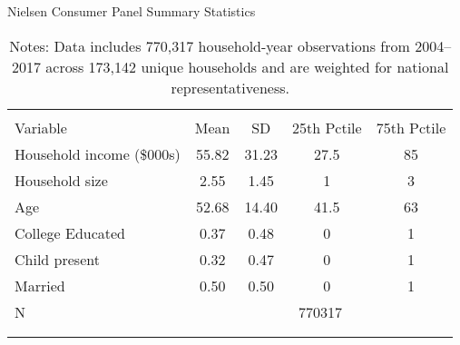 \begin{table}[!htbp] \centering
\caption{Nielsen Consumer Panel Summary Statistics}
\label{tab:homescanSummaryStats}
\begin{tabular}{lcccc}
\\[-1.8ex]\hline
\hline \\[-1.8ex]
Variable                  & Mean  & SD    & 25th Pctile & 75th Pctile\\
\hline
Household income (\$000s) & 55.82 & 31.23 & 27.5        & 85 \\
Household size            & 2.55  & 1.45  & 1           & 3 \\
Age                       & 52.68 & 14.40 & 41.5        & 63 \\
College Educated          & 0.37  & 0.48  & 0           & 1 \\
Child present             & 0.32  & 0.47  & 0           & 1 \\
Married                   & 0.50  & 0.50  & 0           & 1 \\
\hline
N                         & \multicolumn{4}{c}{770317} \\
\\[-1.8ex]\hline
\hline \\[-1.8ex]
\end{tabular}
\caption*{Notes: Data includes 770,317 household-year observations from 2004--2017 across 173,142 unique households and are weighted for national representativeness.}
\end{table}
